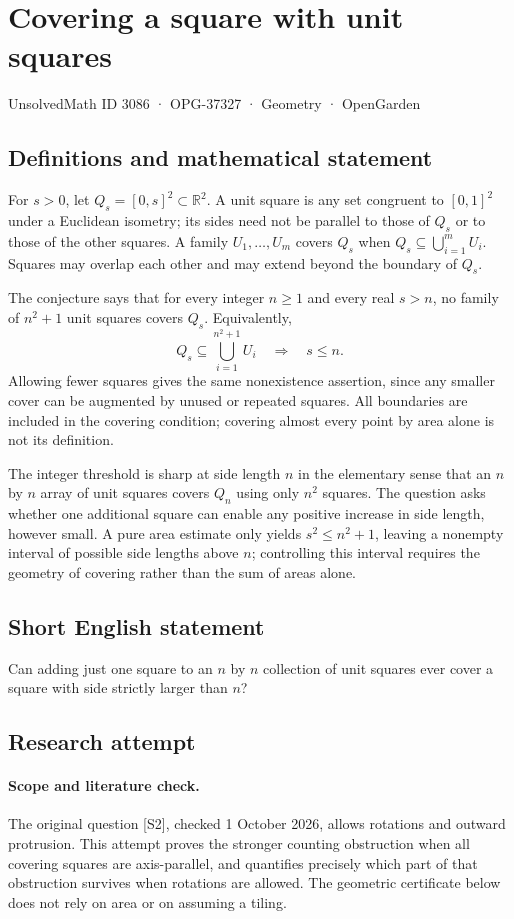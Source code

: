 \documentclass[11pt,a4paper]{article}
\begin{document}
\section*{Covering a square with unit squares}\label{3086}
{\small UnsolvedMath ID 3086 · OPG-37327 · Geometry · OpenGarden}
\subsection{Definitions and mathematical statement}
For $s>0$, let $Q_s=[0,s]^2\subset\mathbb R^2$.
A unit square is any set congruent to $[0,1]^2$ under a Euclidean isometry;
its sides need not be parallel to those of $Q_s$ or to those of the
other squares. A family $U_1,\ldots,U_m$ covers $Q_s$ when
$Q_s\subseteq\bigcup_{i=1}^m U_i$. Squares may overlap each other and
may extend beyond the boundary of $Q_s$.

The conjecture says that for every integer $n\ge1$ and every real
$s>n$, no family of $n^2+1$ unit squares covers $Q_s$. Equivalently,
\[
 Q_s\subseteq\bigcup_{i=1}^{n^2+1}U_i
       \quad\Longrightarrow\quad s\le n.
\]
Allowing fewer squares gives the same nonexistence assertion, since any
smaller cover can be augmented by unused or repeated squares. All boundaries
are included in the covering condition; covering almost every point by
area alone is not its definition.

The integer threshold is sharp at side length $n$ in the elementary
sense that an $n$ by $n$ array of unit squares covers $Q_n$ using only
$n^2$ squares. The question asks whether one additional square can enable
any positive increase in side length, however small. A pure area estimate
only yields $s^2\le n^2+1$, leaving a nonempty interval of possible side
lengths above $n$; controlling this interval requires the geometry of
covering rather than the sum of areas alone.
\subsection{Short English statement}
Can adding just one square to an $n$ by $n$ collection of unit squares ever cover a square with side strictly larger than $n$?
\subsection{Research attempt}
\paragraph{Scope and literature check.}
The original question [S2], checked 1 October 2026, allows rotations and
outward protrusion. This attempt proves the stronger counting obstruction
when all covering squares are axis-parallel, and quantifies precisely which
part of that obstruction survives when rotations are allowed. The geometric
certificate below does not rely on area or on assuming a tiling.
\end{document}
